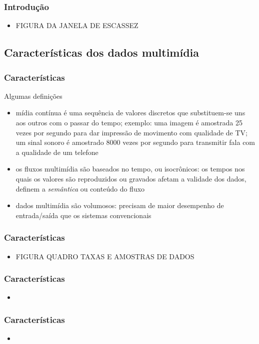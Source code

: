 \documentclass[]{beamer}
\begin{document}
\begin{frame}
  \frametitle{Introdução}
\begin{itemize}
  \item FIGURA DA JANELA DE ESCASSEZ
\end{itemize}
\end{frame}

\subsection{Características dos dados multimídia}

\begin{frame}
  \frametitle{Características}
Algumas definições
\begin{itemize}
  \item mídia contínua é uma sequência de valores discretos que substituem-se uns aos outros
com o passar do tempo; exemplo: uma imagem é amostrada 25 vezes 
por segundo para dar impressão de movimento com qualidade de TV; um sinal sonoro é amostrado
8000 vezes por segundo para transmitir fala com a qualidade de um telefone
  \item os fluxos multimídia são baseados no tempo, ou isocrônicos: os tempos nos quais
os valores são reproduzidos ou gravados afetam a validade dos dados, definem 
a \emph{semântica} ou conteúdo do fluxo
  \item dados multimídia são volumosos: precisam de maior desempenho de entrada/saída que os
sistemas convencionais
\end{itemize}
\end{frame}

\begin{frame}
  \frametitle{Características}
\begin{itemize}
  \item FIGURA QUADRO TAXAS E AMOSTRAS DE DADOS
\end{itemize}
\end{frame}

\begin{frame}
  \frametitle{Características}
\begin{itemize}
  \item 
\end{itemize}
\end{frame}

\begin{frame}
  \frametitle{Características}
\begin{itemize}
  \item 
\end{itemize}
\end{frame}
\end{document}
